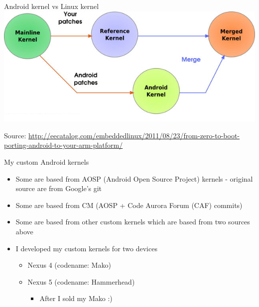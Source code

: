 \documentclass{beamer}
\begin{document}
\begin{frame}{Android kernel vs Linux kernel}
 \includegraphics[scale=0.6]{kernel.png}
 
 \tiny Source: \url{http://eecatalog.com/embeddedlinux/2011/08/23/from-zero-to-boot-porting-android-to-your-arm-platform/}
\end{frame}


\begin{frame}{My custom Android kernels}
 \begin{itemize}
  \item Some are based from AOSP (Android Open Source Project) kernels - original source are from Google's git
  \item Some are based from CM (AOSP + Code Aurora Forum (CAF) commits)
  \item Some are based from other custom kernels which are based from two sources above
 \end{itemize}

\end{frame}

\begin{frame}
 \begin{itemize}
  \item I developed my custom kernels for two devices
  \begin{itemize}
   \item Nexus 4 (codename: Mako)
   \item \pause Nexus 5 (codename: Hammerhead) 
   \begin{itemize}
    \item \pause After I sold my Mako :)
   \end{itemize}

  \end{itemize}

 \end{itemize}

\end{frame}
\end{document}
